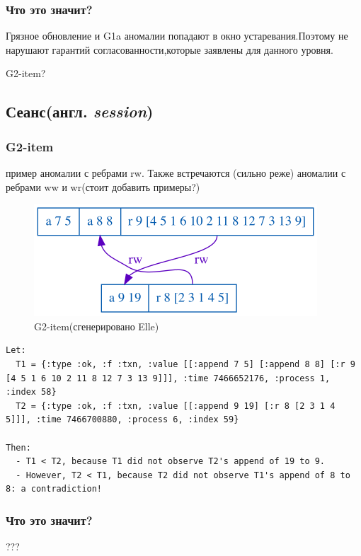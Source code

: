 \documentclass[12pt,  openany]{book}
\begin{document}
\subsubsection{Что это значит?}
\par
Грязное обновление и G1a аномалии попадают в окно устаревания.Поэтому не нарушают гарантий согласованности,которые заявлены для данного уровня.
\par
G2-item?

\subsection{Сеанс(англ.  \textit{session})}
\subsubsection{G2-item}
пример аномалии с ребрами rw. Также встречаются (сильно реже) аномалии с ребрами ww и wr(стоит добавить примеры?)
\begin{figure}[H]
  \includegraphics[width=\textwidth]{session/32.png}
  \caption{G2-item(сгенерировано Elle)}
\end{figure}
\par
\begin{lstlisting}[caption={Пояснение к G2-item аномалии (сгенерировано Elle)}]
Let:
  T1 = {:type :ok, :f :txn, :value [[:append 7 5] [:append 8 8] [:r 9 [4 5 1 6 10 2 11 8 12 7 3 13 9]]], :time 7466652176, :process 1, :index 58}
  T2 = {:type :ok, :f :txn, :value [[:append 9 19] [:r 8 [2 3 1 4 5]]], :time 7466700880, :process 6, :index 59}

Then:
  - T1 < T2, because T1 did not observe T2's append of 19 to 9.
  - However, T2 < T1, because T2 did not observe T1's append of 8 to 8: a contradiction!
\end{lstlisting}
\subsubsection{Что это значит?}
???
\end{document}
